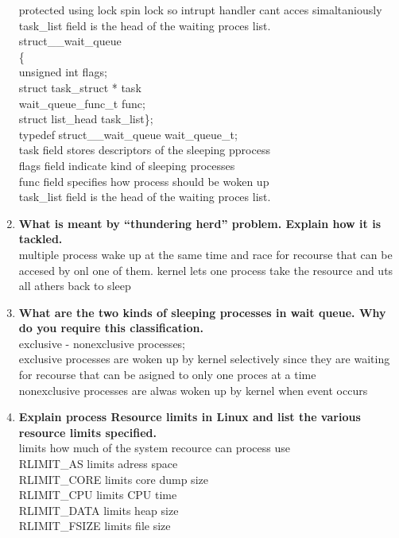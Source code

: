 \documentclass[a4paper,12pt]{article}
\begin{document}
\begin{flushleft}
\begin{enumerate}
{protected using lock spin lock so intrupt handler cant acces simaltaniously\\
task\_list field is the head of the waiting proces list.\\
struct\_\_wait\_queue\\\{\\unsigned int flags;\\struct task\_struct * task\\ wait\_queue\_func\_t func;\\struct list\_head task\_list\};\\typedef struct\_\_wait\_queue wait\_queue\_t;\\task field stores descriptors of the sleeping pprocess\\flags field indicate kind of sleeping processes\\func field specifies how process should be woken up\\
task\_list field is the head of the waiting proces list.\\}
\item \textbf{ What is meant by “thundering herd” problem. Explain how it is tackled.\\}
{\color{red}multiple process wake up at the same time and race for recourse that can be accesed by onl one of them. kernel lets one process take the resource and uts all athers back to sleep}
\item \textbf{ What are the two kinds of sleeping processes in wait queue. Why do you require this classification.\\}
{\color{red}exclusive - nonexclusive processes;\\
exclusive processes are woken up by kernel selectively since they are waiting for recourse that can be asigned to only one proces at a time\\
nonexclusive processes are alwas woken up by kernel when event occurs}
\item \textbf{ Explain process Resource limits in Linux and list the various resource limits specified.\\}
{\color{red}limits how much of the system recource can process use\\
RLIMIT\_AS limits adress space\\
RLIMIT\_CORE limits core dump size\\
RLIMIT\_CPU limits CPU time\\
RLIMIT\_DATA limits heap size\\
RLIMIT\_FSIZE limits file size\\
}
\end{enumerate}
\end{flushleft}
\end{document}
